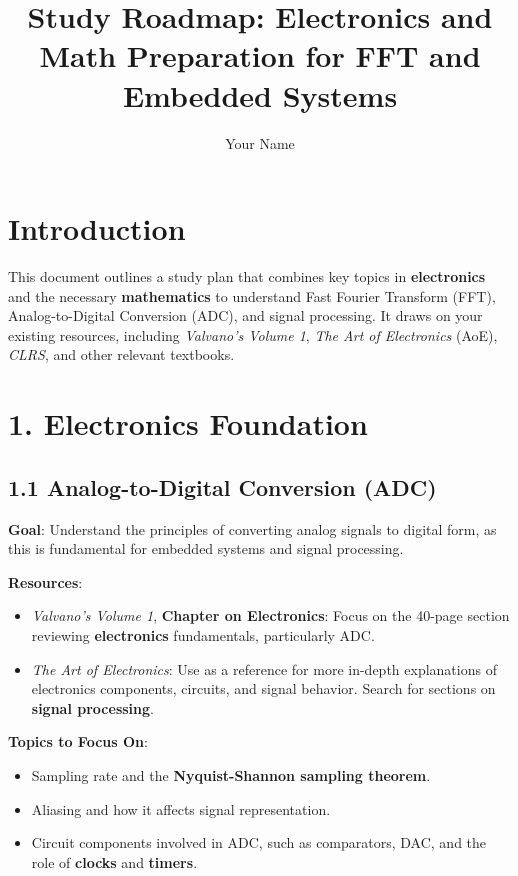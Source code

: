 \documentclass{article}
\title{Study Roadmap: Electronics and Math Preparation for FFT and Embedded Systems}
\author{Your Name}
\date{}
\begin{document}
\maketitle

\section*{Introduction}
This document outlines a study plan that combines key topics in \textbf{electronics} and the necessary \textbf{mathematics} to understand Fast Fourier Transform (FFT), Analog-to-Digital Conversion (ADC), and signal processing. It draws on your existing resources, including \textit{Valvano’s Volume 1}, \textit{The Art of Electronics} (AoE), \textit{CLRS}, and other relevant textbooks.

\section*{1. Electronics Foundation}

\subsection*{1.1 Analog-to-Digital Conversion (ADC)}
\textbf{Goal}: Understand the principles of converting analog signals to digital form, as this is fundamental for embedded systems and signal processing.

\textbf{Resources}:
\begin{itemize}
    \item \textit{Valvano’s Volume 1}, \textbf{Chapter on Electronics}: Focus on the 40-page section reviewing \textbf{electronics} fundamentals, particularly ADC.
    \item \textit{The Art of Electronics}: Use as a reference for more in-depth explanations of electronics components, circuits, and signal behavior. Search for sections on \textbf{signal processing}.
\end{itemize}

\textbf{Topics to Focus On}:
\begin{itemize}
    \item Sampling rate and the \textbf{Nyquist-Shannon sampling theorem}.
    \item Aliasing and how it affects signal representation.
    \item Circuit components involved in ADC, such as comparators, DAC, and the role of \textbf{clocks} and \textbf{timers}.
\end{itemize}
\end{document}
